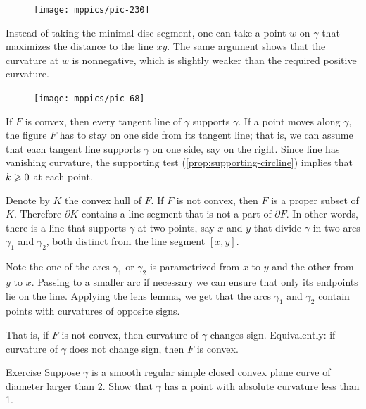 \begin{figure}
\vskip-6mm
\centering
\texttt{[image: mppics/pic-230]}
\vskip0mm
\end{figure}

Instead of taking the minimal disc segment, one can take a point $w$ on $\gamma$ that maximizes the distance to the line $xy$.
The same argument shows that the curvature at $w$ is nonnegative, which is slightly weaker than the required positive curvature.

\begin{figure}
\centering
\texttt{[image: mppics/pic-68]}
\vskip0mm
\end{figure}

If $F$ is convex, then every tangent line of $\gamma$ supports $\gamma$.
If a point moves along $\gamma$, the figure $F$ has to stay on one side from its tangent line;
that is, we can assume that each tangent line supports $\gamma$ on one side, say on the right.
Since line has vanishing curvature, the supporting test (\ref{prop:supporting-circline}) implies that $k\geqslant 0$ at each point.

Denote by $K$ the convex hull of $F$.
If $F$ is not convex, then $F$ is a proper subset of $K$.
Therefore $\partial K$ contains a line segment that is not a part of $\partial F$.
In other words, there is a line that supports $\gamma$ at two points, say $x$ and $y$ that divide $\gamma$ in two arcs $\gamma_1$ and $\gamma_2$, both distinct from the line segment $[x,y]$.

Note the one of the arcs $\gamma_1$ or $\gamma_2$ is parametrized from $x$ to $y$ and the other from $y$ to $x$.
Passing to a smaller arc if necessary we can ensure that only its endpoints lie on the line. 
Applying the lens lemma, we get that the arcs $\gamma_1$ and $\gamma_2$ contain points with curvatures of opposite signs.

That is, if $F$ is not convex, then curvature of $\gamma$ changes sign.
Equivalently: if curvature of $\gamma$ does not change sign, then $F$ is convex.
\qeds

\begin{thm}{Exercise}\label{ex:convex small}
Suppose $\gamma$ is a smooth regular simple closed convex plane curve of diameter larger than 2.
Show that $\gamma$ has a point with absolute curvature less than 1.
\end{thm}

